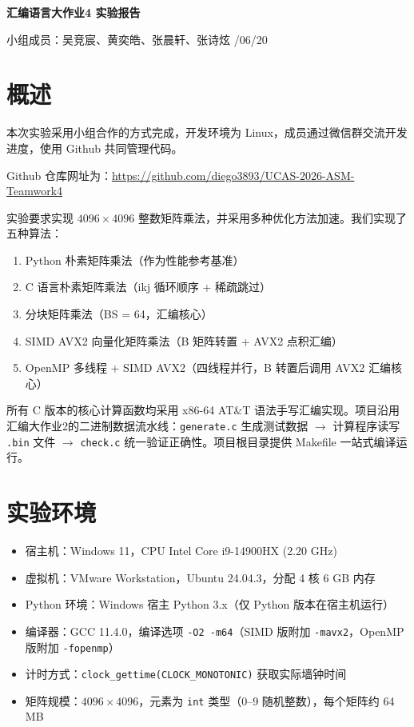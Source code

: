 \documentclass[11pt]{article}
\begin{document}
\begin{center}
    {\LARGE \bf 汇编语言大作业4 \quad 实验报告} \\
\end{center}
\begin{kaishu}
    小组成员：吴竞宸、黄奕皓、张晨轩、张诗炫 \hfill {}/06/20
\end{kaishu}

\section{概述}
本次实验采用小组合作的方式完成，开发环境为 Linux，成员通过微信群交流开发进度，使用 Github 共同管理代码。

Github 仓库网址为：\url{https://github.com/diego3893/UCAS-2026-ASM-Teamwork4}

实验要求实现 $4096 \times 4096$ 整数矩阵乘法，并采用多种优化方法加速。我们实现了五种算法：
\begin{enumerate}
    \item Python 朴素矩阵乘法（作为性能参考基准）
    \item C 语言朴素矩阵乘法（ikj 循环顺序 + 稀疏跳过）
    \item 分块矩阵乘法（BS = 64，汇编核心）
    \item SIMD AVX2 向量化矩阵乘法（B 矩阵转置 + AVX2 点积汇编）
    \item OpenMP 多线程 + SIMD AVX2（四线程并行，B 转置后调用 AVX2 汇编核心）
\end{enumerate}

所有 C 版本的核心计算函数均采用 x86-64 AT\&T 语法手写汇编实现。项目沿用汇编大作业2的二进制数据流水线：\texttt{generate.c} 生成测试数据 $\rightarrow$ 计算程序读写 \texttt{.bin} 文件 $\rightarrow$ \texttt{check.c} 统一验证正确性。项目根目录提供 Makefile 一站式编译运行。

\section{实验环境}
\begin{itemize}
    \item 宿主机：Windows 11，CPU Intel Core i9-14900HX (2.20 GHz)
    \item 虚拟机：VMware Workstation，Ubuntu 24.04.3，分配 4 核 6 GB 内存
    \item Python 环境：Windows 宿主 Python 3.x（仅 Python 版本在宿主机运行）
    \item 编译器：GCC 11.4.0，编译选项 \texttt{-O2 -m64}（SIMD 版附加 \texttt{-mavx2}，OpenMP 版附加 \texttt{-fopenmp}）
    \item 计时方式：\texttt{clock\_gettime(CLOCK\_MONOTONIC)} 获取实际墙钟时间
    \item 矩阵规模：$4096 \times 4096$，元素为 \texttt{int} 类型（0--9 随机整数），每个矩阵约 64 MB
\end{itemize}
\end{document}
